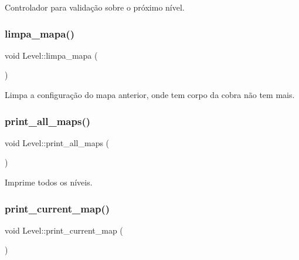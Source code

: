 Controlador para validação sobre o próximo nível. 

\mbox{\label{classLevel_a4f17b96d65d88f2c0764417c6acb435c}} 
\subsubsection{\texorpdfstring{limpa\+\_\+mapa()}{limpa\_mapa()}}
{\footnotesize\ttfamily void Level\+::limpa\+\_\+mapa (\begin{DoxyParamCaption}{ }\end{DoxyParamCaption})\hspace{0.3cm}{\ttfamily [inline]}}



Limpa a configuração do mapa anterior, onde tem corpo da cobra não tem mais. 

\mbox{\label{classLevel_a3502a6e0ebca94ed3529dd9bae317823}} 
\subsubsection{\texorpdfstring{print\+\_\+all\+\_\+maps()}{print\_all\_maps()}}
{\footnotesize\ttfamily void Level\+::print\+\_\+all\+\_\+maps (\begin{DoxyParamCaption}{ }\end{DoxyParamCaption})\hspace{0.3cm}{\ttfamily [inline]}}



Imprime todos os níveis. 

\mbox{\label{classLevel_a3b73a93c34030adbfe08794d61ed3840}} 
\subsubsection{\texorpdfstring{print\+\_\+current\+\_\+map()}{print\_current\_map()}}
{\footnotesize\ttfamily void Level\+::print\+\_\+current\+\_\+map (\begin{DoxyParamCaption}{ }\end{DoxyParamCaption})\hspace{0.3cm}{\ttfamily [inline]}}



